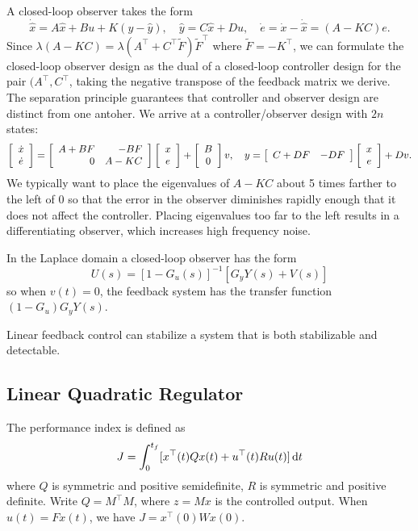 \documentclass{article}
\begin{document}
A closed-loop observer takes the form
$$
\dot{\hat{x}} = A\hat{x} + B u + K(y - \hat{y}), \quad
\hat{y} = C \hat{x} + D u, \quad
\dot{e} = \dot{x} - \dot{\hat{x}} = (A - KC)e.
$$
Since $\lambda(A - KC) = \lambda(A^\top + C^\top \tilde{F})
\tilde{F}^\top$ where $\tilde{F} = -K^\top$, we can formulate the
closed-loop observer design as the dual of a closed-loop controller
design for the pair $(A^\top, C^\top$, taking the negative transpose
of the feedback matrix we derive. The separation principle guarantees
that controller and observer design are distinct from one antoher. We
arrive at a controller/observer design with $2n$ states:
$$
\left[\begin{array}{c}
  \dot{x} \\
  \dot{e}
\end{array}\right] =
\left[\begin{array}{r r}
  A + B F &    -B F \\
        0 & A - K C
\end{array}\right]
\left[\begin{array}{c}
  x \\
  e
\end{array}\right]
+
\left[\begin{array}{c}
  B \\
  0
\end{array}\right]v, \quad
y =
\left[\begin{array}{r r}
  C + DF & -DF
\end{array}\right]
\left[\begin{array}{c}
  x \\
  e
\end{array}\right]
+ D v.
$$
We typically want to place the eigenvalues of $A - KC$ about 5 times
farther to the left of 0 so that the error in the observer diminishes
rapidly enough that it does not affect the controller. Placing
eigenvalues too far to the left results in a differentiating observer,
which increases high frequency noise.

In the Laplace domain a closed-loop observer has the form
$$
U(s) = [1 - G_u(s)]^{-1} [G_y Y(s) + V(s)]
$$
so when $v(t) = 0$, the feedback system has the transfer function
$(1 - G_u)G_y Y(s)$.

Linear feedback control can stabilize a system that is both
stabilizable and detectable.

\subsection{Linear Quadratic Regulator}
The performance index is defined as
$$
J = \int_0^{t_f} [x^\top(t) Q x(t) + u^\top (t) R u(t)] \dif t
$$
where $Q$ is symmetric and positive semidefinite, $R$ is symmetric
and positive definite. Write $Q = M^\top M$, where $z = M x$ is the
controlled output. When $u(t) = F x(t)$, we have
$J = x^\top(0) W x(0)$.
\end{document}
